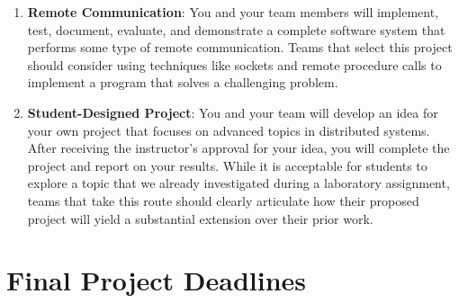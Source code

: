 \begin{enumerate}
  \item {\bf Remote Communication}: You and your team members will implement, test, document, evaluate, and
    demonstrate a complete software system that performs some type of remote communication.  Teams that select this
    project should consider using techniques like sockets and remote procedure calls to implement a program that solves
    a challenging problem.

  \item {\bf Student-Designed Project}: You and your team will develop an idea for your own project that focuses on
    advanced topics in distributed systems. After receiving the instructor's approval for your idea, you will complete
    the project and report on your results. While it is acceptable for students to explore a topic that we already
    investigated during a laboratory assignment, teams that take this route should clearly articulate how their proposed
    project will yield a substantial extension over their prior work.

\end{enumerate}

\vspace*{-.05in}

\section*{Final Project Deadlines}


